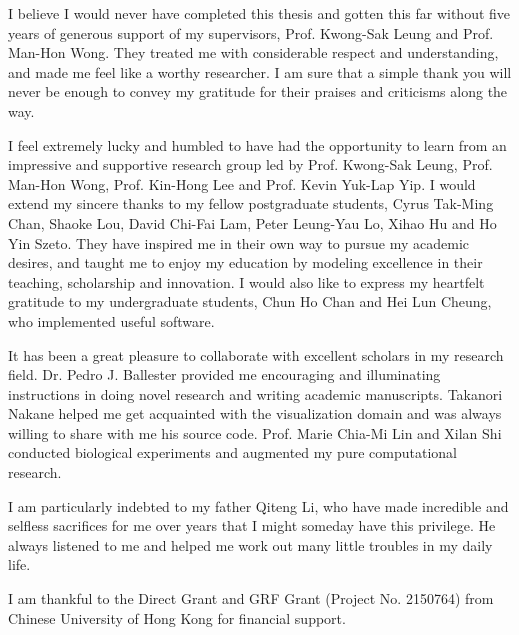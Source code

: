I believe I would never have completed this thesis and gotten this far without five years of generous support of my supervisors, Prof. Kwong-Sak Leung and Prof. Man-Hon Wong. They treated me with considerable respect and understanding, and made me feel like a worthy researcher. I am sure that a simple thank you will never be enough to convey my gratitude for their praises and criticisms along the way.

I feel extremely lucky and humbled to have had the opportunity to learn from an impressive and supportive research group led by Prof. Kwong-Sak Leung, Prof. Man-Hon Wong, Prof. Kin-Hong Lee and Prof. Kevin Yuk-Lap Yip. I would extend my sincere thanks to my fellow postgraduate students, Cyrus Tak-Ming Chan, Shaoke Lou, David Chi-Fai Lam, Peter Leung-Yau Lo, Xihao Hu and Ho Yin Szeto. They have inspired me in their own way to pursue my academic desires, and taught me to enjoy my education by modeling excellence in their teaching, scholarship and innovation. I would also like to express my heartfelt gratitude to my undergraduate students, Chun Ho Chan and Hei Lun Cheung, who implemented useful software.

It has been a great pleasure to collaborate with excellent scholars in my research field. Dr. Pedro J. Ballester provided me encouraging and illuminating instructions in doing novel research and writing academic manuscripts. Takanori Nakane helped me get acquainted with the visualization domain and was always willing to share with me his source code. Prof. Marie Chia-Mi Lin and Xilan Shi conducted biological experiments and augmented my pure computational research.

I am particularly indebted to my father Qiteng Li, who have made incredible and selfless sacrifices for me over years that I might someday have this privilege. He always listened to me and helped me work out many little troubles in my daily life.

I am thankful to the Direct Grant and GRF Grant (Project No. 2150764) from Chinese University of Hong Kong for financial support.
